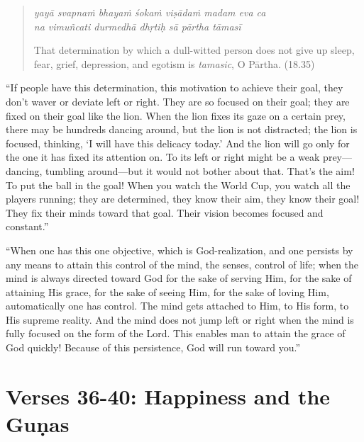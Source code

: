 \documentclass[12pt, twoside, openright]{memoir}
\begin{document}
\par
\begin{verse}
\textit{yayā svapnaṁ bhayaṁ śokaṁ viṣādaṁ madam eva ca} \\
\textit{na vimuñcati durmedhā dhṛtiḥ sā pārtha tāmasī}

\noindent That determination by which a dull-witted person does not give up sleep, fear, grief, depression, and egotism is \textit{tamasic}, O Pārtha. (18.35)
\end{verse}
\par


\enquote{If people have this determination, this motivation to achieve their goal, they don’t waver or deviate left or right. They are so focused on their goal; they are fixed on their goal like the lion. When the lion fixes its gaze on a certain prey, there may be hundreds dancing around, but the lion is not distracted; the lion is focused, thinking, \enquote{I will have this delicacy today.} And the lion will go only for the one it has fixed its attention on. To its left or right might be a weak prey---dancing, tumbling around---but it would not bother about that. That’s the aim! To put the ball in the goal! When you watch the World Cup, you watch all the players running; they are determined, they know their aim, they know their goal! They fix their minds toward that goal. Their vision becomes focused and constant.}

\enquote{When one has this one objective, which is God-realization, and one persists by any means to attain this control of the mind, the senses, control of life; when the mind is always directed toward God for the sake of serving Him, for the sake of attaining His grace, for the sake of seeing Him, for the sake of loving Him, automatically one has control. The mind gets attached to Him, to His form, to His supreme reality. And the mind does not jump left or right when the mind is fully focused on the form of the Lord. This enables man to attain the grace of God quickly! Because of this persistence, God will run toward you.}

\newpage
\section{Verses 36-40: Happiness and the Guṇas}\label{sec-verses-36-40-happiness-and-the-gunas}
\end{document}
